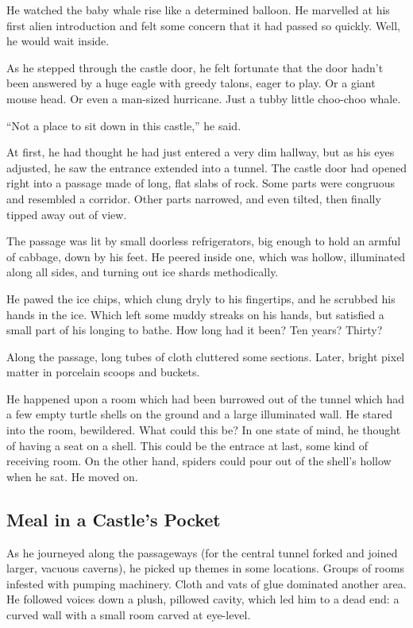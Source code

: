 \documentclass[10pt,twoside]{report}
\begin{document}
He watched the baby whale rise like a determined balloon.  He
marvelled at his first alien introduction and felt some concern that
it had passed so quickly.  Well, he would wait inside.

As he stepped through the castle door, he felt fortunate that the door
hadn't been answered by a huge eagle with greedy talons, eager to
play.  Or a giant mouse head.  Or even a man-sized hurricane.  Just a
tubby little choo-choo whale.

``Not a place to sit down in this castle,'' he said.

At first, he had thought he had just entered a very dim hallway, but
as his eyes adjusted, he saw the entrance extended into a tunnel.  The
castle door had opened right into a passage made of long, flat slabs
of rock.  Some parts were congruous and resembled a corridor.  Other
parts narrowed, and even tilted, then finally tipped away out of view.

The passage was lit by small doorless refrigerators, big enough to
hold an armful of cabbage, down by his feet.  He peered inside one,
which was hollow, illuminated along all sides, and turning out ice
shards methodically.

He pawed the ice chips, which clung dryly to his fingertips, and he
scrubbed his hands in the ice.  Which left some muddy streaks on his
hands, but satisfied a small part of his longing to bathe. How long
had it been?  Ten years?  Thirty?

Along the passage, long tubes of cloth cluttered some sections.
Later, bright pixel matter in porcelain scoops and buckets.

He happened upon a room which had been burrowed out of the tunnel
which had a few empty turtle shells on the ground and a large
illuminated wall.  He stared into the room, bewildered.  What could
this be?  In one state of mind, he thought of having a seat on a
shell.  This could be the entrace at last, some kind of receiving
room.  On the other hand, spiders could pour out of the shell's hollow
when he sat.  He moved on.



\subsection{Meal in a Castle's Pocket}



As he journeyed along the passageways (for the central tunnel forked
and joined larger, vacuous caverns), he picked up themes in some
locations.  Groups of rooms infested with pumping machinery.  Cloth
and vats of glue dominated another area.  He followed voices down a
plush, pillowed cavity, which led him to a dead end: a curved wall
with a small room carved at eye-level.
\end{document}
